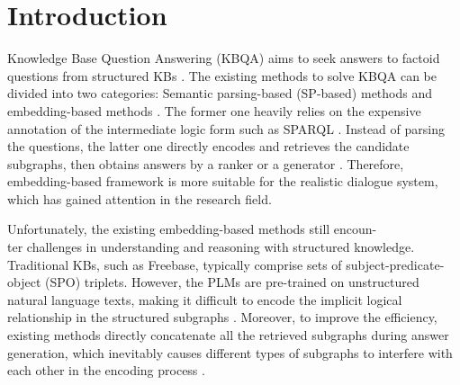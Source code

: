 \documentclass[sigconf,natbib=true,anonymous=False]{acmart}
\begin{document}



\maketitle

\section{Introduction}

Knowledge Base Question Answering (KBQA)  aims to seek answers to factoid questions from structured KBs \cite{auer2007dbpedia,bollacker2008freebase}. The existing methods to solve KBQA can be divided into two categories: Semantic parsing-based (SP-based) methods \cite{ye2021rng,das2022knowledge,lan2020query,sun2020sparqa} and embedding-based methods \cite{agarwal-etal-2021-knowledge,zhang2022subgraph,he2021improving,sun2020faithful,sun2018open,sun2019pullnet}. The former one heavily relies on the expensive annotation of the intermediate logic form such as SPARQL \cite{perez2009semantics}. Instead of parsing the questions, the latter one directly encodes and retrieves the candidate subgraphs, then obtains answers by a ranker or a generator \cite{saxena2022sequence,oguz2020unik,yu2022decaf}. Therefore, embedding-based framework is more suitable for the realistic dialogue system, which has gained attention in the research field.

Unfortunately, the existing embedding-based methods still encoun-\\
ter challenges in understanding and reasoning with structured knowledge. Traditional KBs, such as Freebase, typically comprise sets of subject-predicate-object (SPO) triplets. However, the PLMs are pre-trained on unstructured natural language texts, making it difficult to encode the implicit logical relationship in the structured subgraphs \cite{yang2020improving}. Moreover, to improve the efficiency, existing methods directly concatenate all the retrieved subgraphs during answer generation, which inevitably causes different types of subgraphs to interfere with each other in the encoding process \cite{de2022fido,yu-etal-2022-kg}.
\end{document}
